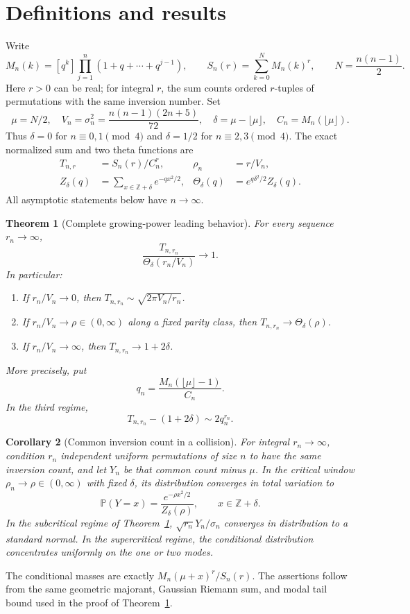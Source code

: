 \documentclass[11pt]{article}
\newtheorem{theorem}{Theorem}\newtheorem{lemma}[theorem]{Lemma}\newtheorem{corollary}[theorem]{Corollary}\newtheorem{remark}[theorem]{Remark}
\newcommand{\V}{V_n}\newcommand{\T}{T_{n,r}}\newcommand{\Z}{\mathbb Z}\newcommand{\E}{\mathbb E}\newcommand{\dd}{\,d}
\begin{document}
\section{Definitions and results}
Write
\[
 M_n(k)=[q^k]\prod_{j=1}^n(1+q+\cdots+q^{j-1}),\qquad
 S_n(r)=\sum_{k=0}^{N}M_n(k)^r,\qquad N=\frac{n(n-1)}2.
\]
Here $r>0$ can be real; for integral $r$, the sum counts ordered $r$-tuples of permutations with the same inversion number. Set
\[
 \mu=N/2,\quad \V=\sigma_n^2=\frac{n(n-1)(2n+5)}{72},\quad
 \delta=\mu-\lfloor\mu\rfloor,\quad C_n=M_n(\lfloor\mu\rfloor).
\]
Thus $\delta=0$ for $n\equiv0,1\pmod4$ and $\delta=1/2$ for $n\equiv2,3\pmod4$. The exact normalized sum and two theta functions are
\begin{align}
 T_{n,r}&=S_n(r)/C_n^r, &\rho_n&=r/\V,\label{mgp:eq:T}\\
 Z_\delta(q)&=\sum_{x\in\Z+\delta}e^{-qx^2/2},&
 \Theta_\delta(q)&=e^{q\delta^2/2}Z_\delta(q).\label{mgp:eq:theta}
\end{align}
All asymptotic statements below have $n\to\infty$.

\begin{theorem}[Complete growing-power leading behavior]\label{mgp:thm:main}
For every sequence $r_n\to\infty$,
\[
 \frac{T_{n,r_n}}{\Theta_{\delta}(r_n/\V)}\longrightarrow1.
\]
In particular:
\begin{enumerate}
\item If $r_n/\V\to0$, then $T_{n,r_n}\sim\sqrt{2\pi\V/r_n}$.
\item If $r_n/\V\to\rho\in(0,\infty)$ along a fixed parity class, then $T_{n,r_n}\to\Theta_\delta(\rho)$.
\item If $r_n/\V\to\infty$, then $T_{n,r_n}\to1+2\delta$.
\end{enumerate}
More precisely, put
\[
 q_n=\frac{M_n(\lfloor\mu\rfloor-1)}{C_n}.
\]
In the third regime,
\[
 T_{n,r_n}-(1+2\delta)\sim2q_n^{r_n}.
\]
\end{theorem}
\begin{corollary}[Common inversion count in a collision]
For integral $r_n\to\infty$, condition $r_n$ independent uniform permutations of size $n$ to have the same inversion count, and let $Y_n$ be that common count minus $\mu$. In the critical window $\rho_n\to\rho\in(0,\infty)$ with fixed $\delta$, its distribution converges in total variation to
\[
 \mathbb P(Y=x)=\frac{e^{-\rho x^2/2}}{Z_\delta(\rho)},\qquad x\in\mathbb Z+\delta.
\]
In the subcritical regime of Theorem~\ref{mgp:thm:main}, $\sqrt{r_n}Y_n/\sigma_n$ converges in distribution to a standard normal. In the supercritical regime, the conditional distribution concentrates uniformly on the one or two modes.
\end{corollary}
The conditional masses are exactly $M_n(\mu+x)^r/S_n(r)$. The assertions follow from the same geometric majorant, Gaussian Riemann sum, and modal tail bound used in the proof of Theorem~\ref{mgp:thm:main}.
\end{document}
